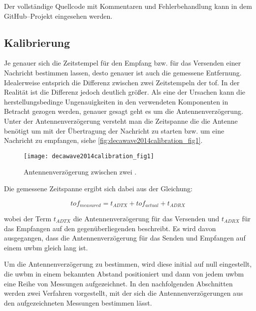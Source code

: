 Der vollständige Quellcode mit Kommentaren und Fehlerbehandlung kann in dem GitHub--Projekt \cite{kasdorf2017roslamwithuwb} eingesehen werden.


\begin{comment}
--------------------------------------------------------------------------------
\end{comment}
\subsection{Kalibrierung}

Je genauer sich die Zeitstempel für den Empfang bzw. für das Versenden einer Nachricht bestimmen lassen, desto genauer ist auch die gemessene Entfernung. Idealerweise entsprich die Differenz zwischen zwei Zeitstempeln der \Gls{tof}. In der Realität ist die Differenz jedoch deutlich größer. Als eine der Ursachen kann die herstellungsbedinge Ungenauigkeiten in den verwendeten Komponenten in Betracht gezogen werden, genauer gesagt geht es um die Antennenverzögerung. Unter der Antennenverzögerung versteht man die Zeitspanne die die Antenne benötigt um mit der Übertragung der Nachricht zu starten bzw. um eine Nachricht zu empfangen, siehe  \autoref{fig:decawave2014calibration_fig1}.

\begin{figure}[h]
	\centering
	\texttt{[image: decawave2014calibration\_fig1]}
	\caption{Antennenverzögerung zwischen zwei .}
	\label{fig:decawave2014calibration_fig1}
\end{figure}

Die gemessene Zeitspanne ergibt sich dabei aus der Gleichung: 

\begin{equation}
tof_{measured}=t_{ADTX}+tof_{actual}+t_{ADRX}\label{eq:antenna_delay_1}
\end{equation}

wobei der Term $t_{ADTX}$ die Antennenverzögerung für das Versenden und $t_{ADRX}$ für das Empfangen auf den gegenüberliegenden  beschreibt. Es wird davon ausgegangen, dass die Antennenverzögerung für das Senden und Empfangen auf einem \Gls{uwbm} gleich lang ist. \cite{decawave2016dw1kusermanual}

Um die Antennenverzögerung zu bestimmen, wird diese initial auf null eingestellt, die \Gls{uwbm} in einem bekannten Abstand positioniert und dann von jedem \Gls{uwbm} eine Reihe von Messungen aufgezeichnet. In den nachfolgenden Abschnitten werden zwei Verfahren vorgestellt, mit der sich die Antennenverzögerungen aus den aufgezeichneten Messungen bestimmen lässt.


